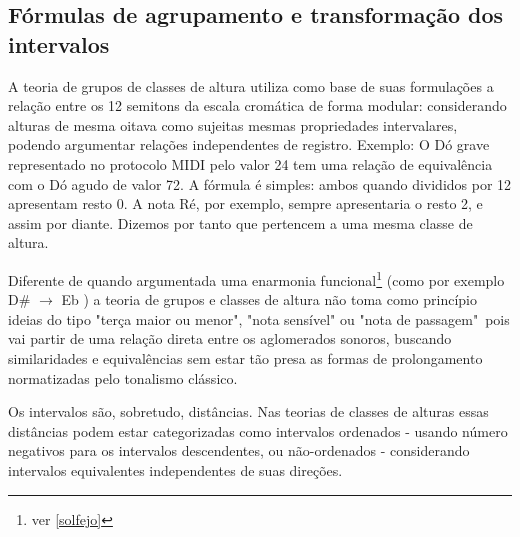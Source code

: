 \documentclass[
	12pt,				%
	openright,			%
	twoside,			%
	a4paper,			%
	english,			%
	french,				%
	spanish,			%
	brazil				%
	]{abntex2}
\begin{document}
%

%
%


\begin{apendicesenv}

\partapendices


\chapter{Fórmulas de agrupamento e transformação dos intervalos}
\label{pos_tonal}

A teoria de grupos de classes de altura utiliza como base de suas formulações a relação entre os 12 semitons da escala cromática de forma modular: considerando alturas de mesma oitava como sujeitas mesmas propriedades intervalares, podendo argumentar relações independentes de registro. Exemplo: O Dó grave representado no protocolo MIDI pelo valor 24 tem uma relação de equivalência com o Dó agudo de valor 72. A fórmula é simples: ambos quando divididos por 12 apresentam resto 0. A nota Ré, por exemplo, sempre apresentaria o resto 2, e assim por diante. Dizemos por tanto que pertencem a uma mesma classe de altura.

Diferente de quando argumentada uma enarmonia funcional\footnote{ver \autoref{solfejo} } (como por exemplo D\# $\to$ Eb ) a teoria de grupos e classes de altura não toma como princípio ideias do tipo "terça maior ou menor", "nota sensível" ou "nota de passagem"\ pois vai partir de uma relação direta entre os aglomerados sonoros, buscando similaridades e equivalências sem estar tão presa as formas de prolongamento normatizadas pelo tonalismo clássico. \cite{lerdahl1989atonal,straus1987problem}

Os intervalos são, sobretudo, distâncias. Nas teorias de classes de alturas essas distâncias podem estar categorizadas como intervalos ordenados - usando número negativos para os intervalos descendentes, ou não-ordenados - considerando intervalos equivalentes independentes de suas direções.\cite[p. 6]{straus2004}


\end{apendicesenv}
\end{document}
